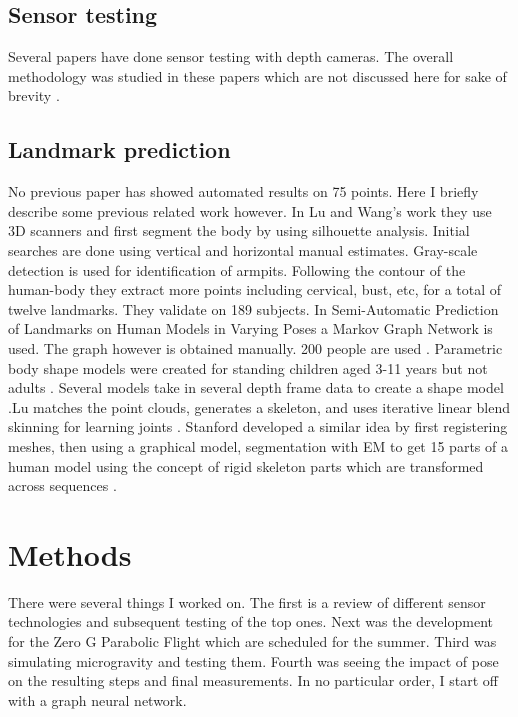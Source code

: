 \section{Sensor testing}
Several papers have done sensor testing with depth cameras. The overall methodology was studied in these papers which are not discussed here for sake of brevity\cite{sophian2017evaluation} \cite{khoshelham2012accuracy} \cite{langmann2012depth} \cite{sankowski2017estimation}.


\section{Landmark prediction}
No previous paper has showed automated results on 75 points. Here I briefly describe some previous related work however. In Lu and Wang's work \cite{lu2008automated} they use 3D scanners and first segment the body by using silhouette analysis. Initial searches are done using vertical and horizontal manual estimates. Gray-scale detection is used for identification of armpits. Following the contour of the human-body they extract more points including cervical, bust, etc, for a total of twelve landmarks. They validate on 189 subjects. In Semi-Automatic Prediction of Landmarks on Human Models in Varying Poses a Markov Graph Network is used. The graph however is obtained manually. 200 people are used \cite{wuhrer2010semi}. Parametric body shape models were created for standing children aged 3-11 years but not adults \cite{park2015parametric}. Several models take in several depth frame data to create a shape model \cite{deng2019neural}.Lu matches the point clouds, generates a skeleton, and uses iterative linear blend skinning for learning joints \cite{lu20193D}. Stanford developed a similar idea by first registering meshes, then using a graphical model, segmentation with EM to get 15 parts of a human model using the concept of rigid skeleton parts which are transformed across sequences \cite{anguelov2012recovering}.


\chapter{Methods}
There were several things I worked on. The first is a review of different sensor technologies and subsequent testing of the top ones. Next was the development for the Zero G Parabolic Flight which are scheduled for the summer. Third was simulating microgravity and testing them. Fourth was seeing the impact of pose on the resulting steps and final measurements. In no particular order, I start off with a graph neural network.

